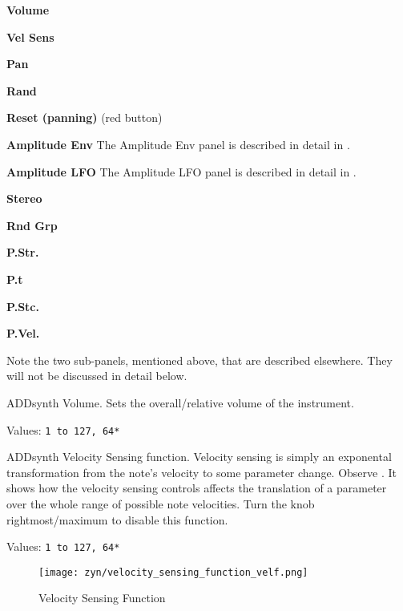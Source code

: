   \begin{enumber}
      \item \textbf{Volume}
      \item \textbf{Vel Sens}
      \item \textbf{Pan}
      \item \textbf{Rand}
      \item \textbf{Reset (panning)} (red button)
      \item \textbf{Amplitude Env}
         The Amplitude Env panel is described in detail in
         .
      \item \textbf{Amplitude LFO}
         The Amplitude LFO panel is described in detail in
         .
      \item \textbf{Stereo}
      \item \textbf{Rnd Grp}
      \item \textbf{P.Str.}
      \item \textbf{P.t}
      \item \textbf{P.Stc.}
      \item \textbf{P.Vel.}
   \end{enumber}

   Note the two sub-panels, mentioned above, that are described elsewhere.
   They will not be discussed in detail below.

   \setcounter{ItemCounter}{0}      %

   ADDsynth Volume.
   Sets the overall/relative volume of the instrument.

   Values: \texttt{1 to 127, 64*}

   ADDsynth Velocity Sensing function.
   Velocity sensing is simply an exponental transformation from the note’s
   velocity to some parameter change.
   Observe .
   It shows how the velocity sensing controls affects the translation of a
   parameter over the whole range of possible note velocities.
   Turn the knob rightmost/maximum to disable this function.

   Values: \texttt{1 to 127, 64*}

\begin{figure}[H]
   \centering 
   \texttt{[image: zyn/velocity\_sensing\_function\_velf.png]}
   \caption{Velocity Sensing Function}
   \label{fig:velocity_sensing_function}
\end{figure}

